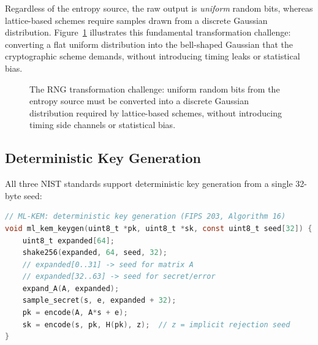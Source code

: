 Regardless of the entropy source, the raw output is \emph{uniform} random bits, whereas lattice-based schemes require samples drawn from a discrete Gaussian distribution.  Figure~\ref{fig:ch12-rng-transform} illustrates this fundamental transformation challenge: converting a flat uniform distribution into the bell-shaped Gaussian that the cryptographic scheme demands, without introducing timing leaks or statistical bias.

\begin{figure}[t]
\centering
{}
\caption{The RNG transformation challenge: uniform random bits from the entropy source must be converted into a discrete Gaussian distribution required by lattice-based schemes, without introducing timing side channels or statistical bias.}
\label{fig:ch12-rng-transform}
\end{figure}

\subsection{Deterministic Key Generation}
\label{subsec:deterministic-keygen}

All three NIST standards support deterministic key generation from a single 32-byte seed:

\begin{lstlisting}[language=C]
// ML-KEM: deterministic key generation (FIPS 203, Algorithm 16)
void ml_kem_keygen(uint8_t *pk, uint8_t *sk, const uint8_t seed[32]) {
    uint8_t expanded[64];
    shake256(expanded, 64, seed, 32);
    // expanded[0..31] -> seed for matrix A
    // expanded[32..63] -> seed for secret/error
    expand_A(A, expanded);
    sample_secret(s, e, expanded + 32);
    pk = encode(A, A*s + e);
    sk = encode(s, pk, H(pk), z);  // z = implicit rejection seed
}
\end{lstlisting}

